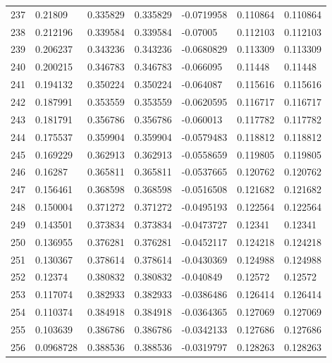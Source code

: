 \begin{longtable}{l|lll|lll}
 237 &  0.21809     & 0.335829    & 0.335829    & -0.0719958   & 0.110864    & 0.110864    \\
 238 &  0.212196    & 0.339584    & 0.339584    & -0.07005     & 0.112103    & 0.112103    \\
 239 &  0.206237    & 0.343236    & 0.343236    & -0.0680829   & 0.113309    & 0.113309    \\
 240 &  0.200215    & 0.346783    & 0.346783    & -0.066095    & 0.11448     & 0.11448     \\
 241 &  0.194132    & 0.350224    & 0.350224    & -0.064087    & 0.115616    & 0.115616    \\
 242 &  0.187991    & 0.353559    & 0.353559    & -0.0620595   & 0.116717    & 0.116717    \\
 243 &  0.181791    & 0.356786    & 0.356786    & -0.060013    & 0.117782    & 0.117782    \\
 244 &  0.175537    & 0.359904    & 0.359904    & -0.0579483   & 0.118812    & 0.118812    \\
 245 &  0.169229    & 0.362913    & 0.362913    & -0.0558659   & 0.119805    & 0.119805    \\
 246 &  0.16287     & 0.365811    & 0.365811    & -0.0537665   & 0.120762    & 0.120762    \\
 247 &  0.156461    & 0.368598    & 0.368598    & -0.0516508   & 0.121682    & 0.121682    \\
 248 &  0.150004    & 0.371272    & 0.371272    & -0.0495193   & 0.122564    & 0.122564    \\
 249 &  0.143501    & 0.373834    & 0.373834    & -0.0473727   & 0.12341     & 0.12341     \\
 250 &  0.136955    & 0.376281    & 0.376281    & -0.0452117   & 0.124218    & 0.124218    \\
 251 &  0.130367    & 0.378614    & 0.378614    & -0.0430369   & 0.124988    & 0.124988    \\
 252 &  0.12374     & 0.380832    & 0.380832    & -0.040849    & 0.12572     & 0.12572     \\
 253 &  0.117074    & 0.382933    & 0.382933    & -0.0386486   & 0.126414    & 0.126414    \\
 254 &  0.110374    & 0.384918    & 0.384918    & -0.0364365   & 0.127069    & 0.127069    \\
 255 &  0.103639    & 0.386786    & 0.386786    & -0.0342133   & 0.127686    & 0.127686    \\
 256 &  0.0968728   & 0.388536    & 0.388536    & -0.0319797   & 0.128263    & 0.128263    \\

\end{longtable}
